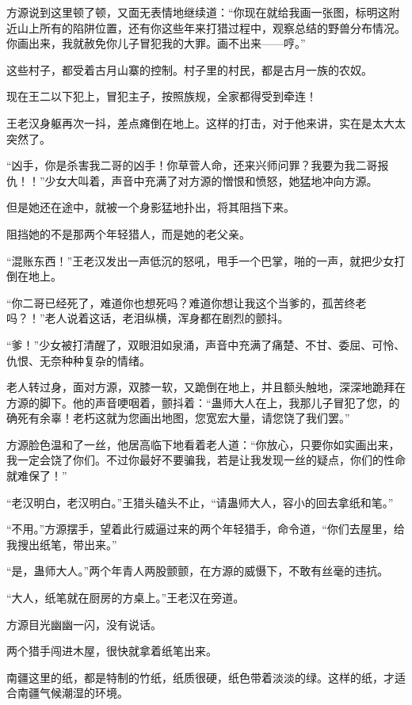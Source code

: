 \begin{this_body}
方源说到这里顿了顿，又面无表情地继续道：“你现在就给我画一张图，标明这附近山上所有的陷阱位置，还有你这些年来打猎过程中，观察总结的野兽分布情况。你画出来，我就赦免你儿子冒犯我的大罪。画不出来——哼。”

这些村子，都受着古月山寨的控制。村子里的村民，都是古月一族的农奴。

现在王二以下犯上，冒犯主子，按照族规，全家都得受到牵连！

王老汉身躯再次一抖，差点瘫倒在地上。这样的打击，对于他来讲，实在是太大太突然了。

“凶手，你是杀害我二哥的凶手！你草菅人命，还来兴师问罪？我要为我二哥报仇！！”少女大叫着，声音中充满了对方源的憎恨和愤怒，她猛地冲向方源。

但是她还在途中，就被一个身影猛地扑出，将其阻挡下来。

阻挡她的不是那两个年轻猎人，而是她的老父亲。

“混账东西！”王老汉发出一声低沉的怒吼，甩手一个巴掌，啪的一声，就把少女打倒在地上。

“你二哥已经死了，难道你也想死吗？难道你想让我这个当爹的，孤苦终老吗？！”老人说着这话，老泪纵横，浑身都在剧烈的颤抖。

“爹！”少女被打清醒了，双眼泪如泉涌，声音中充满了痛楚、不甘、委屈、可怜、仇恨、无奈种种复杂的情绪。

老人转过身，面对方源，双膝一软，又跪倒在地上，并且额头触地，深深地跪拜在方源的脚下。他的声音哽咽着，颤抖着：“蛊师大人在上，我那儿子冒犯了您，的确死有余辜！老朽这就为您画出地图，您宽宏大量，请您饶了我们罢。”

方源脸色温和了一丝，他居高临下地看着老人道：“你放心，只要你如实画出来，我一定会饶了你们。不过你最好不要骗我，若是让我发现一丝的疑点，你们的性命就难保了！”

“老汉明白，老汉明白。”王猎头磕头不止，“请蛊师大人，容小的回去拿纸和笔。”

“不用。”方源摆手，望着此行威逼过来的两个年轻猎手，命令道，“你们去屋里，给我搜出纸笔，带出来。”

“是，蛊师大人。”两个年青人两股颤颤，在方源的威慑下，不敢有丝毫的违抗。

“大人，纸笔就在厨房的方桌上。”王老汉在旁道。

方源目光幽幽一闪，没有说话。

两个猎手闯进木屋，很快就拿着纸笔出来。

南疆这里的纸，都是特制的竹纸，纸质很硬，纸色带着淡淡的绿。这样的纸，才适合南疆气候潮湿的环境。


\end{this_body}

